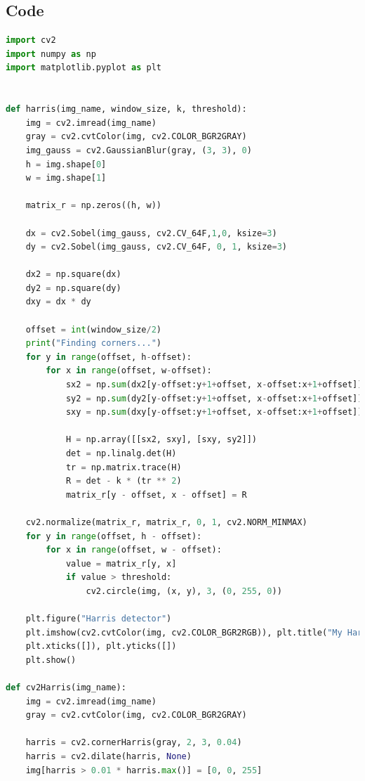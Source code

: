 \documentclass{article}
\begin{document}
    \newpage
    \begin{appendices}

        \section{Code}
        \label{appendix:code}
        \begin{lstlisting}[language=Python]
            import cv2
import numpy as np
import matplotlib.pyplot as plt


def harris(img_name, window_size, k, threshold):
    img = cv2.imread(img_name)
    gray = cv2.cvtColor(img, cv2.COLOR_BGR2GRAY)
    img_gauss = cv2.GaussianBlur(gray, (3, 3), 0)
    h = img.shape[0]
    w = img.shape[1]

    matrix_r = np.zeros((h, w))

    dx = cv2.Sobel(img_gauss, cv2.CV_64F,1,0, ksize=3)
    dy = cv2.Sobel(img_gauss, cv2.CV_64F, 0, 1, ksize=3)

    dx2 = np.square(dx)
    dy2 = np.square(dy)
    dxy = dx * dy

    offset = int(window_size/2)
    print("Finding corners...")
    for y in range(offset, h-offset):
        for x in range(offset, w-offset):
            sx2 = np.sum(dx2[y-offset:y+1+offset, x-offset:x+1+offset])
            sy2 = np.sum(dy2[y-offset:y+1+offset, x-offset:x+1+offset])
            sxy = np.sum(dxy[y-offset:y+1+offset, x-offset:x+1+offset])

            H = np.array([[sx2, sxy], [sxy, sy2]])
            det = np.linalg.det(H)
            tr = np.matrix.trace(H)
            R = det - k * (tr ** 2)
            matrix_r[y - offset, x - offset] = R

    cv2.normalize(matrix_r, matrix_r, 0, 1, cv2.NORM_MINMAX)
    for y in range(offset, h - offset):
        for x in range(offset, w - offset):
            value = matrix_r[y, x]
            if value > threshold:
                cv2.circle(img, (x, y), 3, (0, 255, 0))

    plt.figure("Harris detector")
    plt.imshow(cv2.cvtColor(img, cv2.COLOR_BGR2RGB)), plt.title("My Harris")
    plt.xticks([]), plt.yticks([])
    plt.show()

def cv2Harris(img_name):
    img = cv2.imread(img_name)
    gray = cv2.cvtColor(img, cv2.COLOR_BGR2GRAY)

    harris = cv2.cornerHarris(gray, 2, 3, 0.04)
    harris = cv2.dilate(harris, None)
    img[harris > 0.01 * harris.max()] = [0, 0, 255]


\end{lstlisting}
\end{appendices}
\end{document}
